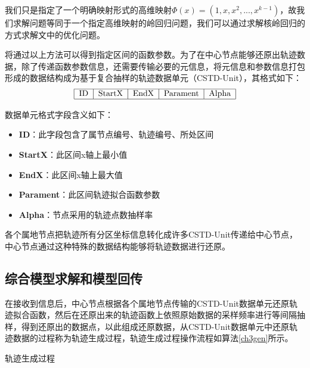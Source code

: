 我们只是指定了一个明确映射形式的高维映射$\varPhi \left( x \right) =\left( 1,x,x^2,...,x^{k-1} \right) $，故我们求解问题等同于一个指定高维映射的岭回归问题，我们可以通过求解核岭回归的方式求解文中的优化问题。

将通过以上方法可以得到指定区间的函数参数。为了在中心节点能够还原出轨迹数据，除了传递函数参数信息，还需要传输必要的元信息，将元信息和参数信息打包形成的数据结构成为基于复合抽样的轨迹数据单元（CSTD-Unit），其格式如下：
$$
\begin{tabular}{|c|c|c|c|c|}
\hline ID&StartX&EndX&Parament&Alpha\\
\hline
\end{tabular}
$$

数据单元格式字段含义如下：
\begin{itemize}
\item \textbf{ID}：此字段包含了属节点编号、轨迹编号、所处区间
\item \textbf{StartX}：此区间x轴上最小值
\item \textbf{EndX}：此区间x轴上最大值
\item \textbf{Parament}：此区间轨迹拟合函数参数
\item \textbf{Alpha}：节点采用的轨迹点数抽样率
\end{itemize}

各个属地节点把轨迹所有分区坐标信息转化成许多CSTD-Unit传递给中心节点，中心节点通过这种特殊的数据结构能够将轨迹数据进行还原。

\subsection{综合模型求解和模型回传}

在接收到信息后，中心节点根据各个属地节点传输的CSTD-Unit数据单元还原轨迹拟合函数，然后在还原出来的轨迹函数上依照原始数据的采样频率进行等间隔抽样，得到还原出的数据点，以此组成还原数据，从CSTD-Unit数据单元中还原轨迹数据的过程称为轨迹生成过程，轨迹生成过程操作流程如算法\ref{ch3gen}所示。

\begin{algorithm}[H]
	 \caption{轨迹生成过程}
	\label{ch3gen}
\end{algorithm}

